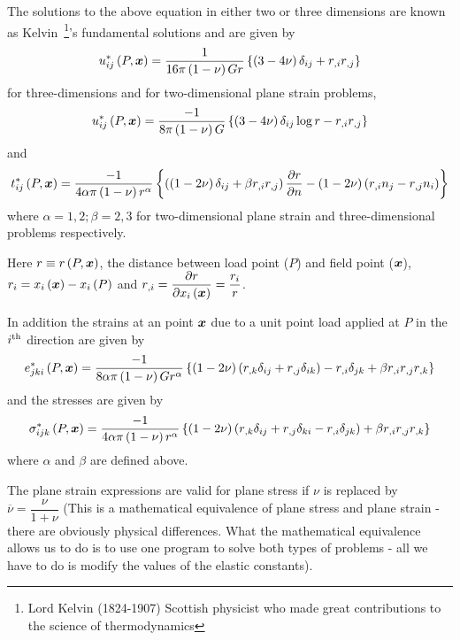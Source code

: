 The solutions to the above equation in either two or three dimensions are
known as Kelvin~\footnote{Lord Kelvin (1824-1907) Scottish physicist who made
  great contributions to the science of thermodynamics}'s fundamental
solutions and are given by
\begin{equation}
  \fnof{u_{ij}^{*}}{P,\vect{x}} = \dfrac{1}{16\pi\pbrac{1 - \nu}Gr}\bbrac{\pbrac{3
    -4\nu} \delta_{ij} + r_{,i}r_{,j}}
  \label{eqn:Kelvin}
\end{equation}
for three-dimensions and for two-dimensional plane strain problems,
\begin{equation}
  \fnof{u_{ij}^{*}}{P,\vect{x}} = \dfrac{-1}{8\pi\pbrac{1 -
      \nu}G}\bbrac{\pbrac{3 -4\nu} \delta_{ij} \log r - r_{,i}r_{,j}}
  \label{eqn:threeD}
\end{equation}
and 
\begin{equation}
  \fnof{t_{ij}^{*}}{P,\vect{x}} = \dfrac{-1}{4 \alpha \pi\pbrac{1 - \nu}r^{\alpha}}
  \bbrac{\pbrac{\pbrac{1-2\nu} \delta_{ij} + \beta r_{,i}r_{,j}} 
      \delby{r}{n} - \pbrac{1-2\nu}\pbrac{r_{,i}n_{j} -r_{,j}n_{i}}} 
  \label{eqn:twoD}
\end{equation}
where $\alpha = 1,2; \beta = 2,3$ for two-dimensional plane strain and
three-dimensional problems respectively.

Here $r\equiv \fnof{r}{P,\vect{x}}$, the distance between load point ($P$) and
field point ($\vect{x}$), 
$r_{i}  = \fnof{x_{i}}{\vect{x}}-\fnof{x_{i}}{P}$ and
$r_{,i} = \delby{r}{\fnof{x_{i}}{\vect{x}}}= \dfrac{r_{i}}{r}$.

In addition the strains at an point $\vect{x}$ due to a unit point load applied
at $P$ in the ${i}^{\text{th}}$ direction are given by
\begin{displaymath}
  \fnof{e_{jki}^{*}}{P,\vect{x}} = \dfrac{-1}{8 \alpha \pi \pbrac{1-\nu}
    Gr^{\alpha}} \bbrac{\pbrac{1-2\nu}\pbrac{r_{,k} \delta_{ij} +r_{,j} \delta
    _{ik}} - r_{,i} \delta_{jk} + \beta r_{,i} r_{,j}r_{,k}}
\end{displaymath}
and the stresses are given by
\begin{displaymath}
  \fnof{\sigma_{ijk}^{*}}{P,\vect{x}} = \dfrac{-1}{4 \alpha \pi \pbrac{1-\nu}
    r^{\alpha}} \bbrac{\pbrac{1-2\nu}\pbrac{r_{,k} \delta_{ij} +r_{,j} \delta
      _{ki} - r_{,i} \delta_{jk}} + \beta r_{,i} r_{,j}r_{,k}}
\end{displaymath}
where $\alpha$ and $\beta$ are defined above.

The plane strain expressions are valid for plane stress if $\nu$ is replaced
by $\overline{\nu} = \dfrac{\nu}{1 + \nu}$ (This is a mathematical equivalence
of plane stress and plane strain - there are obviously physical differences.
What the mathematical equivalence allows us to do is to use one program to
solve both types of problems - all we have to do is modify the values of the
elastic constants).

